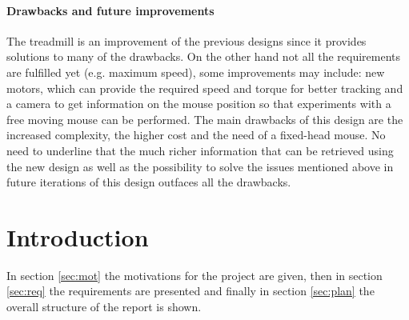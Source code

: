 \documentclass[12pt,a4paper, twoside]{article}
\begin{document}
\begin{multicols}{2}
\paragraph{Drawbacks and future improvements}
The treadmill is an improvement of the previous designs since it provides solutions to many of the drawbacks. On the other hand not all the requirements are fulfilled yet (e.g. maximum speed), some improvements may include: new motors, which can provide the required speed and torque for better tracking and a camera to get information on the mouse position so that experiments with a free moving mouse can be performed. The main drawbacks of this design are the increased complexity, the higher cost and the need of a fixed-head mouse. No need to underline that the much richer information that can be retrieved using the new design as well as the possibility to solve the issues mentioned above in future iterations of this design outfaces all the drawbacks.  



\end{multicols}
\restoregeometry %
\clearpage
\lfoot{ }
\rfoot{ }
\chead{ }


\pagestyle{plain}
\clearpage

\tableofcontents
\clearpage
\pagestyle{fancy}
\section{Introduction}\label{sec:intro}
In section \ref{sec:mot} the motivations for the project are given, then in section \ref{sec:req} the requirements are presented and finally in section \ref{sec:plan} the overall structure of the report is shown.
\end{document}
